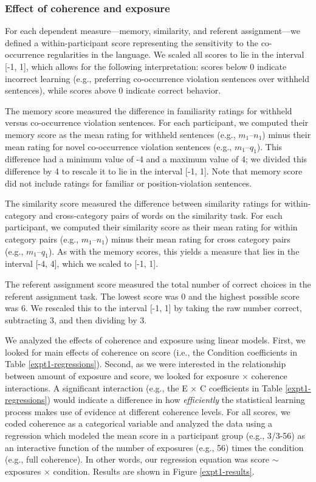 \documentclass[man,floatsintext]{apa6}
\begin{document}
\subsubsection{Effect of coherence and exposure}

For each dependent measure---memory, similarity, and referent assignment---we defined a within-participant score representing the sensitivity to the co-occurrence regularities in the language. We scaled all scores to lie in the interval [-1, 1], which allows for the following interpretation: scores below 0 indicate incorrect learning (e.g., preferring co-occurrence violation sentences over withheld sentences), while scores above 0 indicate correct behavior.

The memory score measured the difference in familiarity ratings for withheld versus co-occurrence violation sentences. For each participant, we computed their memory score as the mean rating for withheld sentences (e.g., $m_1$--$n_1$) minus their mean rating for novel co-occurrence violation sentences (e.g., $m_1$--$q_1$). This difference had a minimum value of -4 and a maximum value of 4; we divided this difference by 4 to rescale it to lie in the interval [-1, 1]. Note that memory score did not include ratings for familiar or position-violation sentences.

The similarity score measured the difference between similarity ratings for within-category and cross-category pairs of words on the similarity task. For each participant, we computed their similarity score as their mean rating for within category pairs (e.g., $m_1$--$n_1$) minus their mean rating for cross category pairs (e.g., $m_1$--$q_1$). As with the memory scores, this yields a measure that lies in the interval [-4, 4], which we scaled to [-1, 1].

The referent assignment score measured the total number of correct choices in the referent assignment task. The lowest score was 0 and the highest possible score was 6. We rescaled this to the interval [-1, 1] by taking the raw number correct, subtracting 3, and then dividing by 3.

We analyzed the effects of coherence and exposure using linear models. First, we looked for main effects of coherence on score (i.e., the Condition coefficients in Table \ref{expt1-regressions}). Second, as we were interested in the relationship between amount of exposure and score, we looked for exposure $\times$ coherence interactions. A significant interaction (e.g., the E $\times$ C coefficients in Table \ref{expt1-regressions}) would indicate a difference in how \emph{efficiently} the statistical learning process makes use of evidence at different coherence levels. For all scores, we coded coherence as a categorical variable and analyzed the data using a regression which modeled the mean score in a participant group (e.g., 3/3-56) as an interactive function of the number of exposures (e.g., 56) times the condition (e.g., full coherence). In other words, our regression equation was score $\sim$ exposures $\times$ condition. Results are shown in Figure \ref{expt1-results}.
\end{document}
